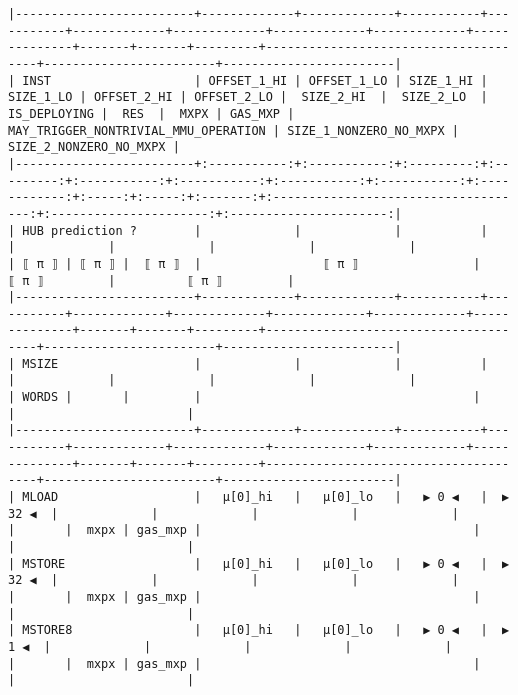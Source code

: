 \documentclass[varwidth=\maxdimen,margin=0.5cm,multi={verbatim}]{standalone}
\begin{document}
\begin{verbatim}
|-------------------------+-------------+-------------+-----------+-----------+-------------+-------------+-------------+-------------+--------------+-------+-------+---------+--------------------------------------+------------------------+------------------------|
| INST                    | OFFSET_1_HI | OFFSET_1_LO | SIZE_1_HI | SIZE_1_LO | OFFSET_2_HI | OFFSET_2_LO |  SIZE_2_HI  |  SIZE_2_LO  | IS_DEPLOYING |  RES  |  MXPX | GAS_MXP | MAY_TRIGGER_NONTRIVIAL_MMU_OPERATION | SIZE_1_NONZERO_NO_MXPX | SIZE_2_NONZERO_NO_MXPX |
|-------------------------+:-----------:+:-----------:+:---------:+:---------:+:-----------:+:-----------:+:-----------:+:-----------:+:------------:+:-----:+:-----:+:-------:+:------------------------------------:+:----------------------:+:----------------------:|
| HUB prediction ?        |             |             |           |           |             |             |             |             |              | ⟦ π ⟧ | ⟦ π ⟧ |  ⟦ π ⟧  |                 ⟦ π ⟧                |          ⟦ π ⟧         |          ⟦ π ⟧         |
|-------------------------+-------------+-------------+-----------+-----------+-------------+-------------+-------------+-------------+--------------+-------+-------+---------+--------------------------------------+------------------------+------------------------|
| MSIZE                   |             |             |           |           |             |             |             |             |              | WORDS |       |         |                                      |                        |                        |
|-------------------------+-------------+-------------+-----------+-----------+-------------+-------------+-------------+-------------+--------------+-------+-------+---------+--------------------------------------+------------------------+------------------------|
| MLOAD                   |   μ[0]_hi   |   μ[0]_lo   |   ▶ 0 ◀   |  ▶  32 ◀  |             |             |             |             |              |       |  mxpx | gas_mxp |                                      |                        |                        |
| MSTORE                  |   μ[0]_hi   |   μ[0]_lo   |   ▶ 0 ◀   |  ▶  32 ◀  |             |             |             |             |              |       |  mxpx | gas_mxp |                                      |                        |                        |
| MSTORE8                 |   μ[0]_hi   |   μ[0]_lo   |   ▶ 0 ◀   |  ▶   1 ◀  |             |             |             |             |              |       |  mxpx | gas_mxp |                                      |                        |                        |

\end{verbatim}
\end{document}
